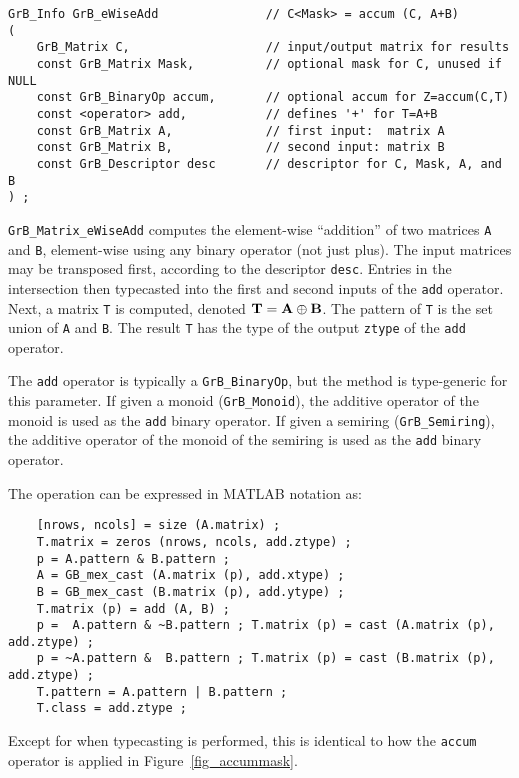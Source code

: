 \documentclass[12pt]{article}
\begin{document}
{\begin{mdframed}[userdefinedwidth=6in]
{\footnotesize
\begin{verbatim}
GrB_Info GrB_eWiseAdd               // C<Mask> = accum (C, A+B)
(
    GrB_Matrix C,                   // input/output matrix for results
    const GrB_Matrix Mask,          // optional mask for C, unused if NULL
    const GrB_BinaryOp accum,       // optional accum for Z=accum(C,T)
    const <operator> add,           // defines '+' for T=A+B
    const GrB_Matrix A,             // first input:  matrix A
    const GrB_Matrix B,             // second input: matrix B
    const GrB_Descriptor desc       // descriptor for C, Mask, A, and B
) ;
\end{verbatim} } \end{mdframed}

\verb'GrB_Matrix_eWiseAdd' computes the element-wise ``addition'' of two
matrices \verb'A' and \verb'B', element-wise using any binary operator (not
just plus).  The input matrices may be transposed first, according to the
descriptor \verb'desc'.  Entries in the intersection then typecasted into the
first and second inputs of the \verb'add' operator.  Next, a matrix \verb'T' is
computed, denoted ${\bf T = A \oplus B}$.  The pattern of \verb'T' is the set
union of \verb'A' and \verb'B'.  The result \verb'T' has the type of the output
\verb'ztype' of the \verb'add' operator.

The \verb'add' operator is typically a \verb'GrB_BinaryOp', but the method is
type-generic for this parameter.  If given a monoid (\verb'GrB_Monoid'), the
additive operator of the monoid is used as the \verb'add' binary operator.  If
given a semiring (\verb'GrB_Semiring'), the additive operator of the monoid of
the semiring is used as the \verb'add' binary operator.

\vspace{0.05in}
The operation can be expressed in MATLAB notation as:
    {\footnotesize
    \begin{verbatim}
    [nrows, ncols] = size (A.matrix) ;
    T.matrix = zeros (nrows, ncols, add.ztype) ;
    p = A.pattern & B.pattern ;
    A = GB_mex_cast (A.matrix (p), add.xtype) ;
    B = GB_mex_cast (B.matrix (p), add.ytype) ;
    T.matrix (p) = add (A, B) ;
    p =  A.pattern & ~B.pattern ; T.matrix (p) = cast (A.matrix (p), add.ztype) ;
    p = ~A.pattern &  B.pattern ; T.matrix (p) = cast (B.matrix (p), add.ztype) ;
    T.pattern = A.pattern | B.pattern ;
    T.class = add.ztype ; \end{verbatim} }
Except for when typecasting is performed, this is identical to how the
\verb'accum' operator is applied in Figure~\ref{fig_accummask}.

}
\end{document}

